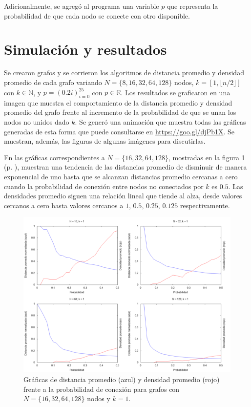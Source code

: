 \documentclass{article}
\begin{document}
  Adicionalmente, se agregó al programa una variable $p$ que representa la probabilidad de que cada nodo se conecte con otro disponible.

  \section{Simulación y resultados}

  Se crearon grafos y se corrieron los algoritmos de distancia promedio y densidad promedio de cada grafo variando $N = \{ 8, 16, 32, 64, 128 \}$ nodos, $k = [1, \lfloor n / 2 \rfloor]$ con $k \in \mathbb{N}$, y $p = (0.2i)_{i= 0}^{25}$ con $p \in \mathbb{R}$. Los resultados se graficaron en una imagen que muestra el comportamiento de la distancia promedio y densidad promedio del grafo frente al incremento de la probabilidad de que se unan los nodos no unidos dado $k$. Se generó una animación que muestra todas las gráficas generadas de esta forma que puede consultarse en \url{https://goo.gl/djPb1X}. Se muestran, además, las figuras de algunas imágenes para discutirlas.

  En las gráficas correspondientes a $N = \{ 16, 32, 64, 128 \} $, mostradas en la figura \ref{ejemplok1} (p. \pageref{ejemplok1}), muestran una tendencia de las distancias promedio de disminuir de manera exponencial de uno hasta que se alcanzan distancias promedio cercanas a cero cuando la probabilidad de conexión entre nodos no conectados por $k$ es $0.5$. Las densidades promedio siguen una relación lineal que tiende al alza, desde valores cercanos a cero hasta valores cercanos a $1$, $0.5$, $0.25$, $0.125$ respectivamente.

  \begin{figure}[h]
    \includegraphics[width=1\textwidth]{ejemplok1}
    \centering
    \caption{Gráficas de distancia promedio (azul) y densidad promedio (rojo) frente a la probabilidad de conexión para grafos con $N = \{ 16, 32, 64, 128 \} $ nodos y $k = 1$.}
    \label{ejemplok1}
  \end{figure}
\end{document}
